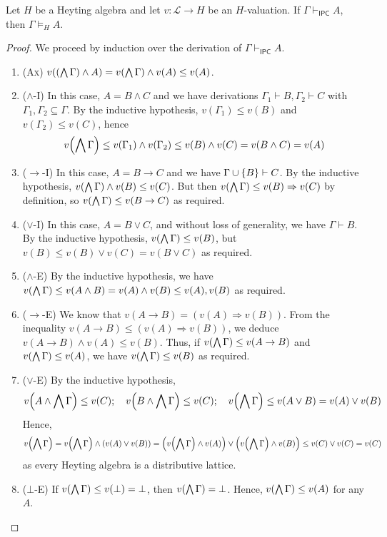 \begin{lemma}[soundness]
    Let \( H \) be a Heyting algebra and let \( v : \mathcal L \to H \) be an \( H \)-valuation.
    If \( \Gamma \vdash_{\mathsf{IPC}} A \), then \( \Gamma \vDash_H A \).
\end{lemma}
\begin{proof}
    We proceed by induction over the derivation of \( \Gamma \vdash_{\mathsf{IPC}} A \).
    \begin{enumerate}
        \item (\textsc{Ax}) \( v\qty((\bigwedge \Gamma) \wedge A) = v\qty(\bigwedge \Gamma) \wedge v(A) \leq v(A) \).
        \item (\( \wedge \)-I) In this case, \( A = B \wedge C \) and we have derivations \( \Gamma_1 \vdash B, \Gamma_2 \vdash C \) with \( \Gamma_1, \Gamma_2 \subseteq \Gamma \).
        By the inductive hypothesis, \( v(\Gamma_1) \leq v(B) \) and \( v(\Gamma_2) \leq v(C) \), hence
        \[ v\qty(\bigwedge \Gamma) \leq v(\Gamma_1) \wedge v(\Gamma_2) \leq v(B) \wedge v(C) = v(B \wedge C) = v(A) \]
        \item (\( \to \)-I) In this case, \( A = B \to C \) and we have \( \Gamma \cup \qty{B} \vdash C \).
        By the inductive hypothesis, \( v\qty(\bigwedge\Gamma) \wedge v(B) \leq v(C) \).
        But then \( v\qty(\bigwedge\Gamma) \leq v(B) \Rightarrow v(C) \) by definition, so \( v\qty(\bigwedge\Gamma) \leq v(B \to C) \) as required.
        \item (\( \vee \)-I) In this case, \( A = B \vee C \), and without loss of generality, we have \( \Gamma \vdash B \).
        By the inductive hypothesis, \( v\qty(\bigwedge \Gamma) \leq v(B) \), but \( v(B) \leq v(B) \vee v(C) = v(B \vee C) \) as required.
        \item (\( \wedge \)-E) By the inductive hypothesis, we have \( v\qty(\bigwedge \Gamma) \leq v(A \wedge B) = v(A) \wedge v(B) \leq v(A), v(B) \) as required.
        \item (\( \to \)-E) We know that \( v(A \to B) = (v(A) \Rightarrow v(B)) \).
        From the inequality \( v(A \to B) \leq (v(A) \Rightarrow v(B)) \), we deduce \( v(A \to B) \wedge v(A) \leq v(B) \).
        Thus, if \( v\qty(\bigwedge \Gamma) \leq v(A \to B) \) and \( v\qty(\bigwedge \Gamma) \leq v(A) \), we have \( v\qty(\bigwedge \Gamma) \leq v(B) \) as required.
        \item (\( \vee \)-E) By the inductive hypothesis,
        \[ v\qty(A \wedge \bigwedge \Gamma) \leq v(C);\quad v\qty(B \wedge \bigwedge \Gamma) \leq v(C);\quad v\qty(\bigwedge \Gamma) \leq v(A \vee B) = v(A) \vee v(B) \]
        Hence,
        \[ v\qty(\bigwedge \Gamma) = v\qty(\bigwedge \Gamma) \wedge (v(A) \vee v(B)) = \qty(v\qty(\bigwedge \Gamma) \wedge v(A)) \vee \qty(v\qty(\bigwedge \Gamma) \wedge v(B)) \leq v(C) \vee v(C) = v(C) \]
        as every Heyting algebra is a distributive lattice.
        \item (\( \bot \)-E) If \( v\qty(\bigwedge\Gamma) \leq v(\bot) = \bot \), then \( v\qty(\bigwedge \Gamma) = \bot \).
        Hence, \( v\qty(\bigwedge \Gamma) \leq v(A) \) for any \( A \).
    \end{enumerate}
\end{proof}

